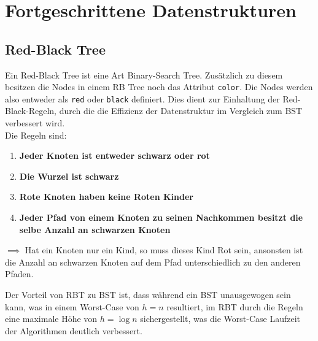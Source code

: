 \documentclass[
../../AuD-Zusammenfassung.tex,
]
{subfiles}
\begin{document}
\section{Fortgeschrittene Datenstrukturen}
\subsection{Red-Black Tree}
Ein Red-Black Tree ist eine Art Binary-Search Tree. Zusätzlich zu diesem besitzen die Nodes in einem RB Tree noch das Attribut \texttt{color}. Die Nodes werden also entweder als \texttt{red} oder \texttt{black} definiert. Dies dient zur Einhaltung der Red-Black-Regeln, durch die die Effizienz der Datenstruktur im Vergleich zum BST verbessert wird.\\
Die Regeln sind:
\begin{enumerate}
    \item \textbf{Jeder Knoten ist entweder schwarz oder rot}
    \item \textbf{Die Wurzel ist schwarz}
    \item \textbf{Rote Knoten haben keine Roten Kinder}
    \item \textbf{Jeder Pfad von einem Knoten zu seinen Nachkommen besitzt die selbe Anzahl an schwarzen Knoten}
\end{enumerate}
\begin{center}
    $\implies$ Hat ein Knoten nur ein Kind, so muss dieses Kind Rot sein, ansonsten ist die Anzahl an schwarzen Knoten auf dem Pfad unterschiedlich zu den anderen Pfaden.
\end{center}
Der Vorteil von RBT zu BST ist, dass während ein BST unausgewogen sein kann, was in einem Worst-Case von $h = n$ resultiert, im RBT durch die Regeln eine maximale Höhe von $h = \log n$ sichergestellt, was die Worst-Case Laufzeit der Algorithmen deutlich verbessert.

\begin{minipage}[t]{0.5\textwidth}
    \centering
\end{minipage}
\end{document}
